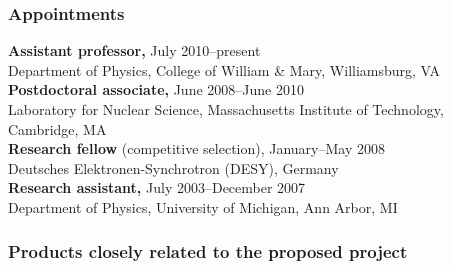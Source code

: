 \documentclass[11pt,letterpaper]{article}
\begin{document}

\subsubsection*{Appointments}

\textbf{Assistant professor,} July 2010--present \\
Department of Physics, College of William \& Mary, Williamsburg, VA \\
%
\textbf{Postdoctoral associate,} June 2008--June 2010 \\
Laboratory for Nuclear Science, Massachusetts Institute of Technology, Cambridge, MA \\
%
\textbf{Research fellow} (competitive selection), January--May 2008 \\
Deutsches Elektronen-Synchrotron (DESY), Germany \\
%
\textbf{Research assistant,} July 2003--December 2007 \\
Department of Physics, University of Michigan, Ann Arbor, MI


\subsubsection*{Products closely related to the proposed project\footnotemark{}}

\end{document}
